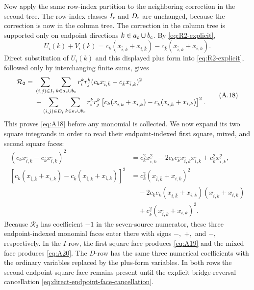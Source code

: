 \documentclass[11pt]{article}
\begin{document}
Now apply the same row-index partition to the neighboring correction in the
second tree.  The row-index classes $I_{\rm r}$ and $D_{\rm r}$ are unchanged,
because the correction is now in the column tree.  The correction in the
column tree is
supported only on endpoint directions
$k\in a_{\rm c}\cup b_{\rm c}$.  By
\eqref{eq:R2-explicit},
\[
U_i(k)+V_i(k)
=c_k(x_{\bar i,\bar k}+x_{i,\bar k})
-c_{\bar k}(x_{\bar i,k}+x_{i,k}).
\]
Direct substitution of $U_i(k)$ and this displayed plus form into
\eqref{eq:R2-explicit}, followed only by interchanging finite sums, gives
\begin{equation}\label{eq:A18}
\begin{aligned}
\mathcal R_2
={}&\sum_{(i,j)\in I_{\rm r}}\sum_{k\in a_{\rm c}\cup b_{\rm c}}
 r_i^kr_j^k(c_kx_{\bar i,\bar k}-c_{\bar k}x_{\bar i,k})^2\\
&+\sum_{(i,j)\in D_{\rm r}}\sum_{k\in a_{\rm c}\cup b_{\rm c}}r_i^kr_j^k
\left[c_k(x_{\bar i,\bar k}+x_{i,\bar k})
-c_{\bar k}(x_{\bar i,k}+x_{i,k})\right]^2.
\end{aligned}
\tag{A.18}
\end{equation}
This proves \eqref{eq:A18} before any monomial is collected.  We now expand
its two square integrands in order to read their endpoint-indexed first
square, mixed, and second square faces:
\[
\begin{aligned}
(c_kx_{\bar i,\bar k}-c_{\bar k}x_{\bar i,k})^2
&=c_k^2x_{\bar i,\bar k}^2
-2c_kc_{\bar k}x_{\bar i,\bar k}x_{\bar i,k}
+c_{\bar k}^2x_{\bar i,k}^2,\\
\left[c_k(x_{\bar i,\bar k}+x_{i,\bar k})
-c_{\bar k}(x_{\bar i,k}+x_{i,k})\right]^2
&=c_k^2(x_{\bar i,\bar k}+x_{i,\bar k})^2\\
&\quad-2c_kc_{\bar k}(x_{\bar i,\bar k}+x_{i,\bar k})
(x_{\bar i,k}+x_{i,k})\\
&\quad+c_{\bar k}^2(x_{\bar i,k}+x_{i,k})^2.
\end{aligned}
\]
Because $\mathcal R_2$ has coefficient $-1$ in the seven-source numerator,
these three endpoint-indexed monomial faces enter there with signs $-,$ $+,$
and $-,$ respectively.  In the $I$-row, the first square face produces
\eqref{eq:A19} and the mixed face produces \eqref{eq:A20}.  The $D$-row has
the same three numerical coefficients with the ordinary variables replaced
by the plus-form variables.  In both rows the second endpoint square face
remains present until the explicit bridge-reversal cancellation
\eqref{eq:direct-endpoint-face-cancellation}.
\end{document}
